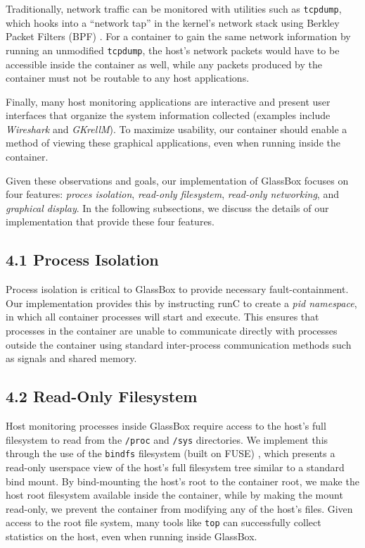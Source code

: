\documentclass{proc}
\begin{document}
Traditionally, network traffic can be monitored with utilities such as \texttt{tcpdump}, which hooks into a ``network tap'' in the kernel's network stack using Berkley Packet Filters (BPF) \cite{bsdpacketfilter}. For a container to gain the same network information by running an unmodified \texttt{tcpdump}, the host's network packets would have to be accessible inside the container as well, while any packets produced by the container must not be routable to any host applications.

Finally, many host monitoring applications are interactive and present user interfaces that organize the system information collected (examples include \textit{Wireshark} and \textit{GKrellM}). To maximize usability, our container should enable a method of viewing these graphical applications, even when running inside the container.

Given these observations and goals, our implementation of GlassBox focuses on four features: \textit{proces isolation}, \textit{read-only filesystem}, \textit{read-only networking}, and \textit{graphical display}. In the following subsections, we discuss the details of our implementation that provide these four features.

\subsection*{4.1 Process Isolation}

Process isolation is critical to GlassBox to provide necessary fault-containment. Our implementation provides this by instructing runC to create a \textit{pid namespace}, in which all container processes will start and execute. This ensures that processes in the container are unable to communicate directly with processes outside the container using standard inter-process communication methods such as signals and shared memory.

\subsection*{4.2 Read-Only Filesystem}

Host monitoring processes inside GlassBox require access to the host's full filesystem to read from the \texttt{/proc} and \texttt{/sys} directories. We implement this through the use of the \texttt{bindfs} filesystem (built on FUSE) \cite{bindfs}, which presents a read-only userspace view of the host's full filesystem tree similar to a standard bind mount. By bind-mounting the host's root to the container root, we make the host root filesystem available inside the container, while by making the mount read-only, we prevent the container from modifying any of the host's files. Given access to the root file system, many tools like \texttt{top} can successfully collect statistics on the host, even when running inside GlassBox.
\end{document}
